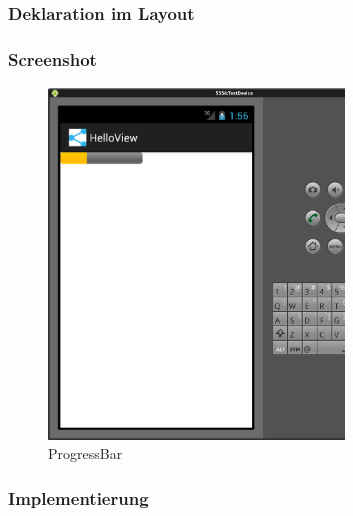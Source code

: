 \begin{frame}
   \frametitle{Deklaration im Layout}
	
\end{frame}

\begin{frame}
   \frametitle{Screenshot}
   \begin{figure}[h!]
	  \centering
	  \includegraphics[width=0.7\textwidth]{pictures/progressbar.ps}
	  \caption{
		  ProgressBar
	  }
	  \label{fig:progressbar}
	\end{figure}
\end{frame}

\begin{frame}
   \frametitle{Implementierung}
	
\end{frame}

